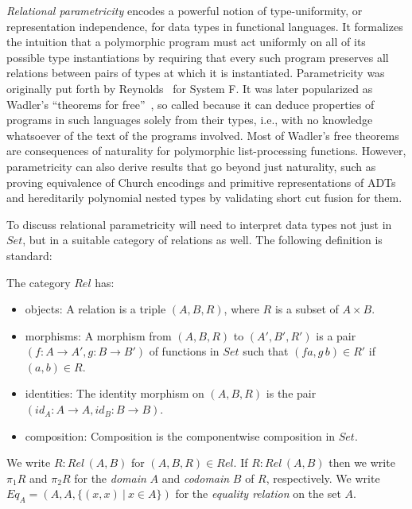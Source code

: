 \documentclass[acmsmall,screen,review,anonymous]{acmart}
\theoremstyle{definition}
\begin{document}
{\em Relational parametricity} encodes a powerful notion of
type-uniformity, or representation independence, for data types in
functional languages. It formalizes the intuition that a polymorphic
program must act uniformly on all of its possible type instantiations
by requiring that every such program preserves all relations between
pairs of types at which it is instantiated. Parametricity was
originally put forth by Reynolds~\cite{rey83} for System F. It was
later popularized as Wadler's ``theorems for free''~\cite{wad89}, so
called because it can deduce properties of programs in such languages
solely from their types, i.e., with no knowledge whatsoever of the
text of the programs involved.  Most of Wadler's free theorems are
consequences of naturality for polymorphic list-processing
functions. However, parametricity can also derive results that go
beyond just naturality, such as proving equivalence of Church
encodings and primitive representations of ADTs and hereditarily
polynomial nested types by validating short cut fusion for them.

To discuss relational parametricity will need to interpret data types
not just in $\mathit{Set}$, but in a suitable category of relations as
well. The following definition is standard:
\begin{definition}
  The category $\mathit{Rel}$ has:
  \begin{itemize}
\item objects: A relation is a triple $(A,B,R)$, where $R$ is a
  subset of $A \times B$.
\item morphisms: A morphism from $(A,B,R)$ to $(A',B',R')$ is a pair
  $(f : A \to A',g : B \to B')$ of functions in $\mathit{Set}$ such
  that $(f a,g\,b) \in R'$ if $(a,b) \in R$.
\item identities: The identity morphism on $(A,B,R)$ is the pair
  $(\mathit{id}_A : A \to A, \mathit{id}_B : B \to B)$.
\item composition: Composition is the componentwise composition in
  $\mathit{Set}$. 
\end{itemize}
\end{definition}
\noindent
We write $R : \mathit{Rel}\,(A,B)$ for $(A,B,R) \in \mathit{Rel}$.  If
$R : \mathit{Rel}\,(A,B)$ then we write $\pi_1 R$ and $\pi_2 R$ for
the {\em domain} $A$ and {\em codomain} $B$ of $R$, respectively. We
write $\mathit{Eq}_A = (A,A,\{(x,x)~|~ x \in A\})$ for the {\em
  equality relation} on the set $A$.
\end{document}
